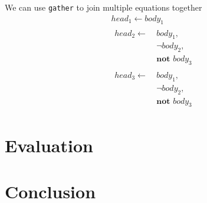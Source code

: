 \documentclass{article}
\begin{document}
We can use \texttt{gather} to join multiple equations together
\begin{gather}
    \label{eq:rule_3}
    head_1 \leftarrow body_1 \\
    \begin{split}
        \label{eq:rule_4}
        head_2 \leftarrow \
            & body_1, \\
            & \neg body_2, \\
            & \textbf{not } body_3
    \end{split} \\
    \begin{split}
        \label{eq:rule_5}
        head_3 \leftarrow \
            & body_1, \\
            & \neg body_2, \\
            & \textbf{not } body_3
    \end{split}
\end{gather}

\section{Evaluation}

\section{Conclusion}

\newpage


\end{document}
